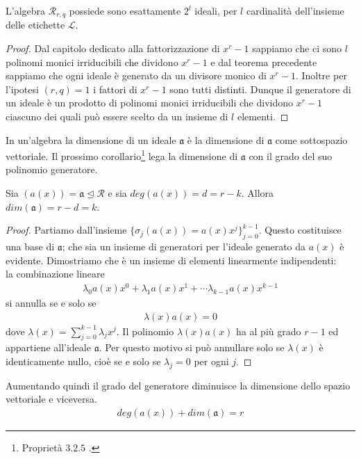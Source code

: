 \begin{corollario} \label{coroll:cardIdealiDiR}
   L'algebra $\mathcal{R}_{r,q}$ possiede sono esattamente $2^{l}$ ideali, per $l$ cardinalità dell'insieme delle etichette $\mathscr{L}$. 
\end{corollario}
\begin{proof}
   Dal capitolo dedicato alla fattorizzazione di $x^r-1$ sappiamo che ci sono $l$ polinomi monici irriducibili che dividono $x^r-1$ e dal teorema precedente sappiamo che ogni ideale è generato da un divisore monico di $x^r - 1$.
   Inoltre per l'ipotesi $(r,q) = 1$ i fattori di $x^r-1$ sono tutti distinti.
   Dunque il generatore di un ideale è un prodotto di polinomi monici irriducibili che dividono $x^r-1$ ciascuno dei quali può essere scelto da un insieme di $l$ elementi.   
\end{proof}

In un'algebra la dimensione di un ideale $\mathfrak{a}$ è la dimensione di $\mathfrak{a}$ come sottospazio vettoriale.
Il prossimo corollario\footnote{Proprietà $3.2.5$ \cite{montabone}.} lega la dimensione di $\mathfrak{a}$ con il grado del suo polinomio generatore.
\begin{corollario} \label{cor:baseDellIdeale}
   Sia $(a(x)) = \mathfrak{a} \unlhd \mathcal{R}$ e sia $deg(a(x)) = d = r-k$. Allora $dim(\mathfrak{a}) = r-d = k $. 
\end{corollario}
\begin{proof}
   Partiamo dall'insieme $\lbrace \sigma_{j}(a(x)) = a(x)x^{j} \rbrace_{j=0}^{k-1}$. Questo costituisce una base di $\mathfrak{a}$; che sia un insieme di generatori per l'ideale generato da $a(x)$ è evidente. Dimostriamo che è un insieme di elementi linearmente indipendenti: \\
   la combinazione lineare
   \begin{align*}
      \lambda_{0} a(x)x^{0} + \lambda_{1} a(x)x^{1}+ \cdots \lambda_{k-1} a(x)x^{k-1}
   \end{align*}
   si annulla se e solo se
   \begin{align*}
      \lambda(x)a(x) = 0
   \end{align*}
   dove $\lambda(x) = \sum_{j=0}^{k-1}\lambda_{j}x^{j}$. Il polinomio $\lambda(x)a(x)$ ha al più grado $r-1$ ed appartiene all'ideale $\mathfrak{a}$. Per questo motivo si può annullare solo se $\lambda(x)$ è identicamente nullo, cioè se e solo se $\lambda_{j} = 0 $ per ogni $j$. 
\end{proof}
\noindent
Aumentando quindi il grado del generatore diminuisce la dimensione dello spazio vettoriale e viceversa. 
\begin{align*}
   deg(a(x)) + dim(\mathfrak{a}) = r
\end{align*}

